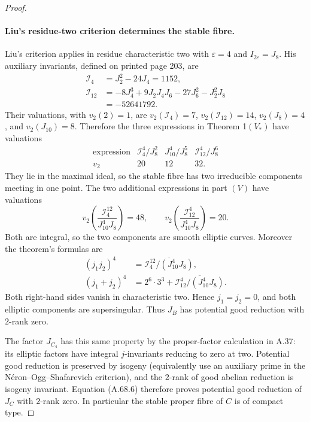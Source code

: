 \begin{proof}
\paragraph{Liu's residue-two criterion determines the stable fibre.}
Liu's criterion \cite[Theorem 1, printed p.204]{fghLiu1993Stable} applies in residue characteristic two
with \(\varepsilon=4\) and \(I_{2\varepsilon}=J_8\). His auxiliary
invariants, defined on printed page 203, are
\[
 \begin{aligned}
 \mathcal I_4&=J_2^2-24J_4=1152,\\
 \mathcal I_{12}&=-8J_4^3+9J_2J_4J_6-27J_6^2-J_2^2J_8\\
                 &=-52641792.
 \end{aligned}
\]
Their valuations, with \(v_2(2)=1\), are
\(v_2(\mathcal I_4)=7\), \(v_2(\mathcal I_{12})=14\),
\(v_2(J_8)=4\), and \(v_2(J_{10})=8\). Therefore the three
expressions in Theorem 1\((V_*)\) have valuations
\[
 \begin{array}{c|ccc}
 \text{expression}&\mathcal I_4^4/J_8^2&J_{10}^4/J_8^5&
                              \mathcal I_{12}^4/J_8^6\\\hline
 v_2&20&12&32.
 \end{array}                                                   \tag{A.68.9}
\]
They lie in the maximal ideal, so the stable fibre has two
irreducible components meeting in one point. The two additional
expressions in part \((V)\) have valuations
\[
 v_2\!\left(\frac{\mathcal I_4^{12}}{J_{10}^4J_8}\right)=48,
 \qquad
 v_2\!\left(\frac{\mathcal I_{12}^{4}}{J_{10}^4J_8}\right)=20.
                                                               \tag{A.68.10}
\]
Both are integral, so the two components are smooth elliptic curves.
Moreover the theorem's formulas are
\[
 \begin{aligned}
 (j_1j_2)^4&=
  \overline{\mathcal I_4^{12}/(J_{10}^4J_8)},\\
 (j_1+j_2)^4&=2^6\cdot3^3+
  \overline{\mathcal I_{12}^{4}/(J_{10}^4J_8)}.
 \end{aligned}
\]
Both right-hand sides vanish in characteristic two. Hence
\(j_1=j_2=0\), and both elliptic components are supersingular.
Thus \(J_B\) has potential good reduction with \(2\)-rank zero.

The factor \(J_{C_4}\) has this same property by the proper-factor
calculation in A.37: its elliptic factors have integral \(j\)-invariants
reducing to zero at two. Potential good reduction is preserved by
isogeny (equivalently use an auxiliary prime in the
N\'eron--Ogg--Shafarevich criterion), and the \(2\)-rank of good
abelian reduction is isogeny invariant. Equation (A.68.6) therefore
proves potential good reduction of \(J_C\) with \(2\)-rank zero.
In particular the stable proper fibre of \(C\) is of compact type.


\end{proof}
